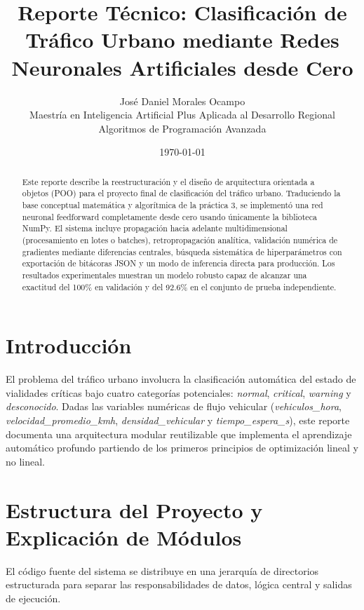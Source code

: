 \documentclass[11pt,a4paper]{article}
\title{\textbf{Reporte Técnico: Clasificación de Tráfico Urbano mediante Redes Neuronales Artificiales desde Cero}}
\author{José Daniel Morales Ocampo \\ \small Maestría en Inteligencia Artificial Plus Aplicada al Desarrollo Regional \\ Algoritmos de Programación Avanzada}
\date{\today}
\begin{document}
\maketitle

\begin{abstract}
Este reporte describe la reestructuración y el diseño de arquitectura orientada a objetos (POO) para el proyecto final de clasificación del tráfico urbano. Traduciendo la base conceptual matemática y algorítmica de la práctica 3, se implementó una red neuronal feedforward completamente desde cero usando únicamente la biblioteca NumPy. El sistema incluye propagación hacia adelante multidimensional (procesamiento en lotes o batches), retropropagación analítica, validación numérica de gradientes mediante diferencias centrales, búsqueda sistemática de hiperparámetros con exportación de bitácoras JSON y un modo de inferencia directa para producción. Los resultados experimentales muestran un modelo robusto capaz de alcanzar una exactitud del 100\% en validación y del 92.6\% en el conjunto de prueba independiente.
\end{abstract}

\section*{Introducción}
El problema del tráfico urbano involucra la clasificación automática del estado de vialidades críticas bajo cuatro categorías potenciales: \textit{normal}, \textit{critical}, \textit{warning} y \textit{desconocido}. Dadas las variables numéricas de flujo vehicular (\textit{vehiculos\_hora}, \textit{velocidad\_promedio\_kmh}, \textit{densidad\_vehicular} y \textit{tiempo\_espera\_s}), este reporte documenta una arquitectura modular reutilizable que implementa el aprendizaje automático profundo partiendo de los primeros principios de optimización lineal y no lineal.

\section*{Estructura del Proyecto y Explicación de Módulos}
El código fuente del sistema se distribuye en una jerarquía de directorios estructurada para separar las responsabilidades de datos, lógica central y salidas de ejecución.
\end{document}
